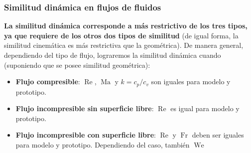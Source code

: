 \documentclass[t]{beamer}
\begin{document}
\begin{frame}
\frametitle{Similitud dinámica en flujos de fluidos}

    \textbf{La similitud dinámica corresponde a más restrictivo de los tres tipos,
ya que requiere de los otros dos tipos de similitud} (de igual forma, la
similitud cinemática es más restrictiva que la geométrica). De manera
general, dependiendo del tipo de flujo, lograremos la similitud dinámica
cuando (suponiendo que se posee similitud geométrica):
\vspace{0.5cm}

    \begin{itemize}
\item
  \textbf{Flujo compresible}: \(\operatorname{Re}\), \(\operatorname{Ma}\) y
  \(k=c_p/c_v\) son iguales para modelo y prototipo.
\item
  \textbf{Flujo incompresible sin superficie libre}: \(\operatorname{Re}\) es
  igual para modelo y prototipo.
\item
  \textbf{Flujo incompresible con superficie libre}: \(\operatorname{Re}\) y
  \(\operatorname{Fr}\) deben ser iguales para modelo y prototipo.
  Dependiendo del caso, también \(\operatorname{We}\)
\end{itemize}

\end{frame}
\end{document}
